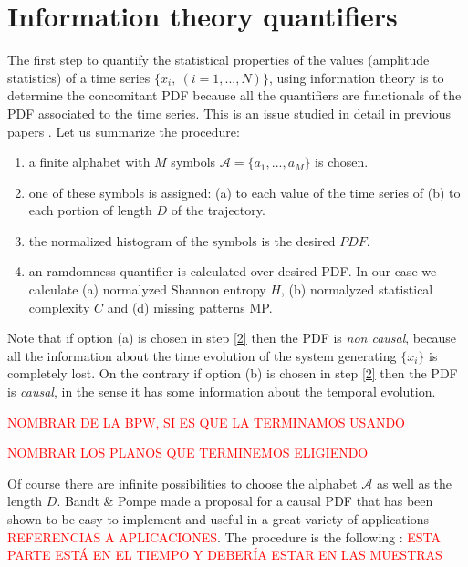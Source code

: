 \section{Information theory quantifiers}\label{sec:quanti}

The first step to quantify the statistical properties of the values (amplitude statistics) of a time series $\{x_i,~(i=1,...,N)\}$, using information theory is to determine the concomitant PDF because all the quantifiers are functionals of the PDF associated to the time series. This is an issue studied in detail in previous papers \cite{aka varios}. Let us summarize the procedure:

\begin{enumerate} 
\item \label{1} a finite alphabet with $M$ symbols $\mathcal{A}=\{a_1,...,a_M\}$ is chosen. 
\item \label{2} one of these symbols is assigned: (a) to each value of the time series of (b) to each portion of length $D$ of the trajectory. 
\item \label{3} the normalized histogram of the symbols is the desired $PDF$.
\item \label{3} an ramdomness quantifier is calculated over desired PDF. In our case we calculate (a) normalyzed Shannon entropy $H$, (b) normalyzed statistical complexity $C$ and (d) missing patterns MP.
\end{enumerate}

Note that if option (a) is chosen in step \ref{2} then the PDF is \textit{non causal}, because all the information about the time evolution of the system generating $\{x_i\}$ is completely lost.
On the contrary if option (b) is chosen in step \ref{2} then the PDF is \textit{causal}, in the sense it has some information about the temporal evolution.

\textcolor{red}{NOMBRAR DE LA BPW, SI ES QUE LA TERMINAMOS USANDO}

\textcolor{red}{NOMBRAR LOS PLANOS QUE TERMINEMOS ELIGIENDO}

Of course there are infinite possibilities to choose the alphabet $\mathcal{A}$ as well as the length $D$.
Bandt \& Pompe made a proposal for a causal PDF that has been shown to be easy to implement and useful in a great variety of applications \textcolor{red}{REFERENCIAS A APLICACIONES}.
The procedure is the following \cite{Pompe2002,Keller2003,Keller2005}: \textcolor{red}{ESTA PARTE ESTÁ EN EL TIEMPO Y DEBERÍA ESTAR EN LAS MUESTRAS}

